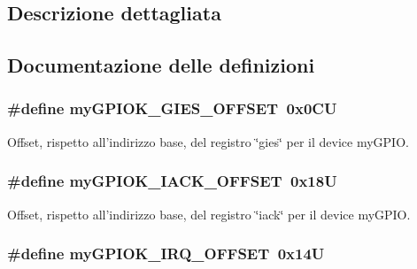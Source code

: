 \subsection{Descrizione dettagliata}


\subsection{Documentazione delle definizioni}
\hypertarget{group__ausiliarie_ga0da2526ca3cd1a94ebcecf96778ea2e5}{
\subsubsection[{my\+G\+P\+I\+O\+K\+\_\+\+G\+I\+E\+S\+\_\+\+O\+F\+F\+S\+E\+T}]{\setlength{\rightskip}{0pt plus 5cm}\#define my\+G\+P\+I\+O\+K\+\_\+\+G\+I\+E\+S\+\_\+\+O\+F\+F\+S\+E\+T~0x0\+C\+U}}\label{group__ausiliarie_ga0da2526ca3cd1a94ebcecf96778ea2e5}


Offset, rispetto all'indirizzo base, del registro \char`\"{}gies\char`\"{} per il device my\+G\+P\+I\+O. 

\hypertarget{group__ausiliarie_gac72408c288009c213c0231973b3fe761}{
\subsubsection[{my\+G\+P\+I\+O\+K\+\_\+\+I\+A\+C\+K\+\_\+\+O\+F\+F\+S\+E\+T}]{\setlength{\rightskip}{0pt plus 5cm}\#define my\+G\+P\+I\+O\+K\+\_\+\+I\+A\+C\+K\+\_\+\+O\+F\+F\+S\+E\+T~0x18\+U}}\label{group__ausiliarie_gac72408c288009c213c0231973b3fe761}


Offset, rispetto all'indirizzo base, del registro \char`\"{}iack\char`\"{} per il device my\+G\+P\+I\+O. 

\hypertarget{group__ausiliarie_ga37ee502d1ba364dfde9261c4f7a537a6}{
\subsubsection[{my\+G\+P\+I\+O\+K\+\_\+\+I\+R\+Q\+\_\+\+O\+F\+F\+S\+E\+T}]{\setlength{\rightskip}{0pt plus 5cm}\#define my\+G\+P\+I\+O\+K\+\_\+\+I\+R\+Q\+\_\+\+O\+F\+F\+S\+E\+T~0x14\+U}}\label{group__ausiliarie_ga37ee502d1ba364dfde9261c4f7a537a6}



